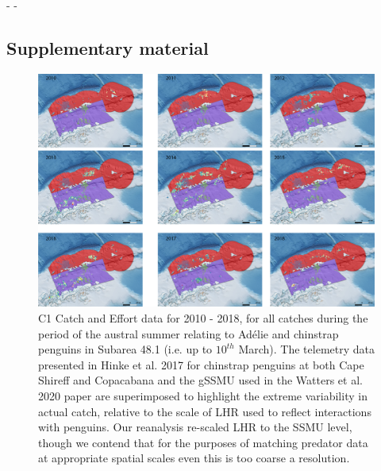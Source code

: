 \documentclass[]{elsarticle} %
\begin{document}
\newpage
\setcounter{table}{0}  \renewcommand{\thetable}{S\arabic{table}}     -   - \setcounter{figure}{0} \renewcommand{\thefigure}{S\arabic{figure}}
\begin{landscape}

\section{Supplementary material}\label{supplementary-material}

\begin{figure}
\includegraphics[width=0.8\linewidth]{./Watters EMM figures/summer catch/Year by year catch} \caption{C1 Catch and Effort data for 2010 - 2018, for all catches during the period of the austral summer relating to Adélie and chinstrap penguins in Subarea 48.1 (i.e. up to $10^{th}$ March).  The telemetry data presented in Hinke et al. 2017 for chinstrap penguins at both Cape Shireff and Copacabana and the gSSMU used in the Watters et al. 2020 paper are superimposed to highlight the extreme variability in actual catch, relative to the scale of LHR used to reflect interactions with penguins.  Our reanalysis re-scaled LHR to the SSMU level, though we contend that for the purposes of matching predator data at appropriate spatial scales even this is too coarse a resolution.}\label{fig:Supplementary Figure 1}
\end{figure}

\end{landscape}
\end{document}

